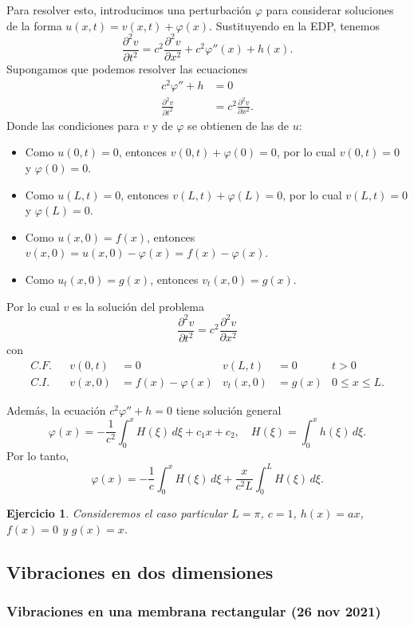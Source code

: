 \documentclass[11pt,letterpaper,draft]{report}
\newtheorem{exe}{Ejercicio}
\newcommand\<{\langle}
\renewcommand\>{\rangle}
\renewcommand\phi\varphi
\begin{document}
Para resolver esto, introducimos una perturbación $\phi$ para
considerar soluciones de la forma $u(x,t)=v(x,t)+\phi(x)$.
Sustituyendo en la EDP, tenemos
\[
  \frac{\partial ^2v}{\partial t^2}
  = c^2 \frac{\partial ^2v}{\partial x^2} + c^2\phi''(x)+ h(x)
.\]
Supongamos que podemos resolver las ecuaciones
\begin{align*}
  c^2\phi''+h &= 0 \\
  \frac{\partial ^2v}{\partial t^2}
  &= c^2 \frac{\partial ^2v}{\partial x^2}.
\end{align*}
Donde las condiciones para $v$ y de $\phi$ se obtienen de las de $u$:
\begin{itemize}
  \item Como $u(0,t) = 0$, entonces $v(0,t)+\phi(0)=0$, por lo cual
    $v(0,t)=0$ y $\phi(0)=0$.
  \item Como $u(L,t)=0$, entonces $v(L,t)+\phi(L)=0$, por lo cual
    $v(L,t)=0$ y $\phi(L)=0$.
  \item Como $u(x,0)=f(x)$, entonces
    $v(x,0)=u(x,0)-\phi(x)=f(x)-\phi(x)$.
  \item Como $u_t(x,0)=g(x)$, entonces $v_t(x,0)=g(x)$.
\end{itemize}
Por lo cual $v$ es la solución del problema
\[
  \frac{\partial ^2v}{\partial t^2}
  = c^2 \frac{\partial ^2v}{\partial x^2}
\]
con
\begin{align*}
  C.F.&& v(0,t)&=0 & v(L,t)&=0 & t>0 \\
  C.I.&& v(x,0)&=f(x)-\phi(x) & v_t(x,0)&=g(x) & 0\leq x\leq L.
\end{align*}

Además, la ecuación $c^2\phi''+h=0$ tiene solución general
\[
  \phi(x) = -\frac{1}{c^2}\int_{0}^{x}H(\xi)\,d\xi+c_1x+c_2,
  \quad H(\xi) = \int_{0}^{x}h(\xi)\,d\xi
.\]
Por lo tanto,
\[
  \phi(x)=-\frac{1}{c}\int_{0}^{x}H(\xi)\,d\xi
  + \frac{x}{c^2L}\int_{0}^{L}H(\xi)\,d\xi
.\]

\begin{exe}
  Consideremos el caso particular $L=\pi$, $c=1$, $h(x)=ax$, $f(x)=0$
  y $g(x)=x$.
\end{exe}

\subsection{Vibraciones en dos dimensiones}

\subsubsection{Vibraciones en una membrana rectangular (26 nov 2021)}
\end{document}
